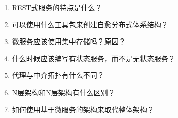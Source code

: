 \begin{enumerate}
\item
REST式服务的特点是什么？

\item
可以使用什么工具包来创建自愈分布式体系结构？

\item
微服务应该使用集中存储吗？原因？

\item
什么时候应该编写有状态服务，而不是无状态服务？

\item
代理与中介拓扑有什么不同？

\item
N层架构和N层架构有什么区别？

\item
如何使用基于微服务的架构来取代整体架构？
\end{enumerate}